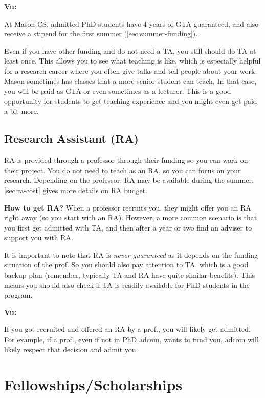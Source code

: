 \documentclass[oneside,11pt,dvipsnames]{book}
\newenvironment{commentbox}[1][]{
  \small
  \begin{mybox}
    {\small \textbf{#1}}
  }{
  \end{mybox}
}
\begin{document}
\begin{commentbox}[Vu:]
  At Mason CS, admitted PhD students have 4 years of GTA guaranteed, and also receive a stipend for the first summer (\autoref{sec:summer-funding}).
\end{commentbox}

Even if you have other funding and do not need a TA, you still should do TA at least once.  This allows you to see what teaching is like, which is especially helpful for a research career where you often give talks and tell people about your work. Mason sometimes has classes that a more senior student can teach.  In that case, you will be paid as GTA or even sometimes as a lecturer.  This is a good opportunity for students to get teaching experience and you might even get paid a bit more.

\subsection{Research Assistant (RA)}\label{sec:ra}
RA is provided through a professor through their funding so you can work on their project.
You do not need to teach as an RA, so you can focus on your research. Depending on the professor, RA may be available during the summer. \autoref{sec:ra-cost} gives more details on RA budget.

\textbf{How to get RA?} When a professor recruits you, they might offer you an RA right away (so you start with an RA).  However, a more common scenario is that you first get admitted with TA, and then after a year or two find an adviser to support you with RA.

It is important to note that RA is \emph{never guaranteed} as it depends on the funding situation of the prof. So you should also pay attention to TA, which is a good backup plan (remember, typically TA and RA have quite similar benefits). This means you should also check if TA is readily available for PhD students in the program.


\begin{commentbox}[Vu:]
  If you got recruited and offered an RA by a prof., you will likely get admitted.  For example, if a prof., even if not in PhD adcom, wants to fund you, adcom will likely respect that decision and admit you.
\end{commentbox}

\section{Fellowships/Scholarships}\label{sec:fellowships}
\end{document}
